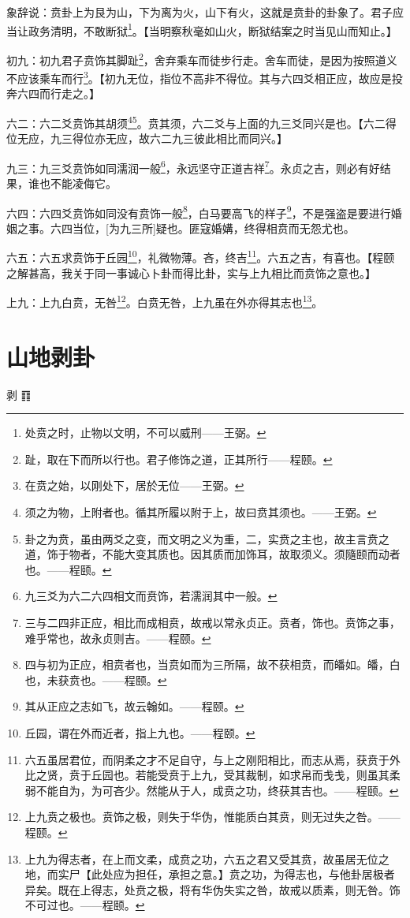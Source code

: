\documentclass[12pt,oneside]{book}
\begin{document}
象辞说：贲卦上为艮为山，下为离为火，山下有火，这就是贲卦的卦象了。君子应当让政务清明，不敢断狱\footnote{处贲之时，止物以文明，不可以威刑——王弼。}。【当明察秋毫如山火，断狱结案之时当见山而知止。】


初九：初九君子贲饰其脚趾\footnote{趾，取在下而所以行也。君子修饰之道，正其所行——程颐。}，舍弃乘车而徒步行走。舍车而徒，是因为按照道义不应该乘车而行\footnote{在贲之始，以刚处下，居於无位——王弼。}。【初九无位，指位不高非不得位。其与六四爻相正应，故应是投奔六四而行走之。】

六二：六二爻贲饰其胡须\footnote{须之为物，上附者也。循其所履以附于上，故曰贲其须也。——王弼。}\footnote{卦之为贲，虽由两爻之变，而文明之义为重，二，实贲之主也，故主言贲之道，饰于物者，不能大变其质也。因其质而加饰耳，故取须义。须隨颐而动者也。——程颐。}。贲其须，六二爻与上面的九三爻同兴是也。【六二得位无应，九三得位亦无应，故六二九三彼此相比而同兴。】

九三：九三爻贲饰如同濡润一般\footnote{九三爻为六二六四相文而贲饰，若濡润其中一般。}，永远坚守正道吉祥\footnote{三与二四非正应，相比而成相贲，故戒以常永贞正。贲者，饰也。贲饰之事，难乎常也，故永贞则吉。——程颐。}。永贞之吉，则必有好结果，谁也不能凌侮它。

六四：六四爻贲饰如同没有贲饰一般\footnote{四与初为正应，相贲者也，当贲如而为三所隔，故不获相贲，而皤如。皤，白也，未获贲也。——程颐。}，白马要高飞的样子\footnote{其从正应之志如飞，故云翰如。——程颐。}，不是强盗是要进行婚姻之事。六四当位，[为九三所]疑也。匪寇婚媾，终得相贲而无怨尤也。

六五：六五求贲饰于丘园\footnote{丘园，谓在外而近者，指上九也。——程颐。}，礼微物薄。吝，终吉\footnote{六五虽居君位，而阴柔之才不足自守，与上之刚阳相比，而志从焉，获贲于外比之贤，贲于丘园也。若能受贲于上九，受其裁制，如求帛而戋戋，则虽其柔弱不能自为，为可吝少。然能从于人，成贲之功，终获其吉也。——程颐。}。六五之吉，有喜也。【程颐之解甚高，我关于同一事诚心卜卦而得比卦，实与上九相比而贲饰之意也。】

上九：上九白贲，无咎\footnote{上九贲之极也。贲饰之极，则失于华伪，惟能质白其贲，则无过失之咎。——程颐。}。白贲无咎，上九虽在外亦得其志也\footnote{上九为得志者，在上而文柔，成贲之功，六五之君又受其贲，故虽居无位之地，而实尸【此处应为担任，承担之意。】贲之功，为得志也，与他卦居极者异矣。既在上得志，处贲之极，将有华伪失实之咎，故戒以质素，则无咎。饰不可过也。——程颐。}。



\chapter{山地剥卦}
剥 {\Large ䷖}
\end{document}
